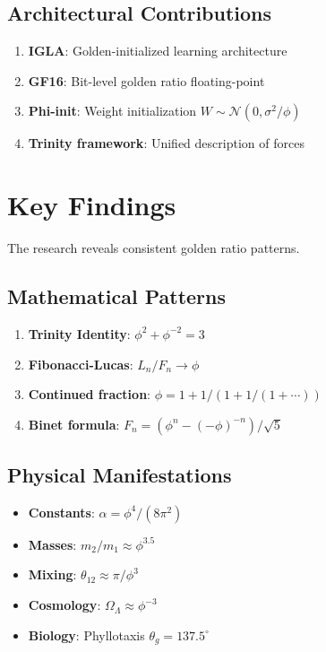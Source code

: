 \subsection{Architectural Contributions}

\begin{enumerate}
    \item \textbf{IGLA}: Golden-initialized learning architecture
    \item \textbf{GF16}: Bit-level golden ratio floating-point
    \item \textbf{Phi-init}: Weight initialization $W \sim \mathcal{N}(0, \sigma^2/\phi)$
    \item \textbf{Trinity framework}: Unified description of forces
\end{enumerate}

\section{Key Findings}

The research reveals consistent golden ratio patterns.

\subsection{Mathematical Patterns}

\begin{enumerate}
    \item \textbf{Trinity Identity}: $\phi^2 + \phi^{-2} = 3$
    \item \textbf{Fibonacci-Lucas}: $L_n/F_n \to \phi$
    \item \textbf{Continued fraction}: $\phi = 1 + 1/(1 + 1/(1 + \cdots))$
    \item \textbf{Binet formula}: $F_n = (\phi^n - (-\phi)^{-n})/\sqrt{5}$
\end{enumerate}

\subsection{Physical Manifestations}

\begin{itemize}
    \item \textbf{Constants}: $\alpha = \phi^4/(8\pi^2)$
    \item \textbf{Masses}: $m_2/m_1 \approx \phi^{3.5}$
    \item \textbf{Mixing}: $\theta_{12} \approx \pi/\phi^3$
    \item \textbf{Cosmology}: $\Omega_\Lambda \approx \phi^{-3}$
    \item \textbf{Biology}: Phyllotaxis $\theta_g = 137.5^\circ$
\end{itemize}


